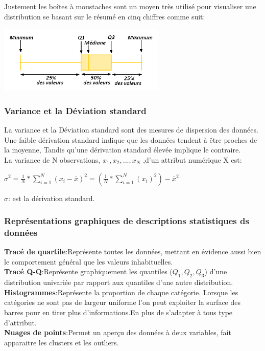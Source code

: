 \documentclass[12pt,a4paper,oneside]{book}
\begin{document}
Justement les boîtes à moustaches sont un moyen très utilisé pour visualiser une distribution se basant sur le résumé en cinq chiffres comme suit:
\begin{center}
	\includegraphics[width=0.6\textwidth]{BoxPlots.png}%
	\label{labelname}%
\end{center}

\subsubsection{Variance et la Déviation standard}
La variance et la Déviation standard sont des mesures de dispersion des données.\\
Une faible dérivation standard indique que les données tendent à être proches de la moyenne, Tandis qu'une dérivation standard élevée implique le contraire.\\

La variance de N observations, $x_{1}, x_{2}, ... ,x_{N}$ ,d'un attribut numérique X est:
\begin{center}
	$\sigma^{2} = \frac{1}{N} * \sum_{i=1}^{N}{(x_{i}-\bar{x})^{2}} = (\frac{1}{N} * \sum_{i=1}^{N}{(x_{i})^{2}})-\bar{x}^{2}$
\end{center}
$\sigma$: est la dérivation standard.

\subsubsection{Représentations graphiques de descriptions statistiques ds données}

\textbf{Tracé de quartile}:Représente toutes les données, mettant en évidence aussi bien le comportement général que les valeurs inhabituelles.\\
\textbf{Tracé Q-Q}:Représente graphiquement les quantiles ($Q_{1},Q_{2},Q_{3}$) d'une distribution univariée par rapport aux quantiles d'une autre distribution.\\
\textbf{Histogrammes}:Représente la proportion de chaque catégorie. Lorsque les catégories ne sont pas de largeur uniforme l'on peut exploiter la surface des barres pour en tirer plus d'informations.En plus de s'adapter à tous type d'attribut.\\
\textbf{Nuages de points}:Permet un aperçu des données à deux variables, fait apparaitre les clusters et les outliers.
\end{document}
